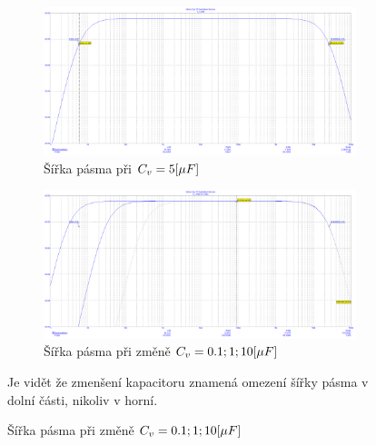 \documentclass{article}
\begin{document}
\hfill

\begin{figure}[H]
  \begin{minipage}[t]{\textwidth}
    \begin{figure}[H]
      \includegraphics[width=\textwidth]{PC/BJT/Sirka_pasma.png}
      \caption{\label{sirka_pasma} Šířka pásma při \(C_v = 5\-[\mu F]\)}
    \end{figure}
    \begin{figure}[H]
      \includegraphics[width=\textwidth]{PC/BJT/Step_sirka_pasma.png}
      \caption{\label{Pohyb_sirky_pasma} Šířka pásma při změně \(C_v = 0.1;1;10\-[\mu F]\)}
    \end{figure}
  \end{minipage}


  \begin{minipage}[t]{\textwidth}
    \vspace{10mm}
    Je vidět že zmenšení kapacitoru znamená omezení šířky pásma v dolní části, nikoliv v horní.
  \end{minipage}
\end{figure}

\newpage
\end{document}
